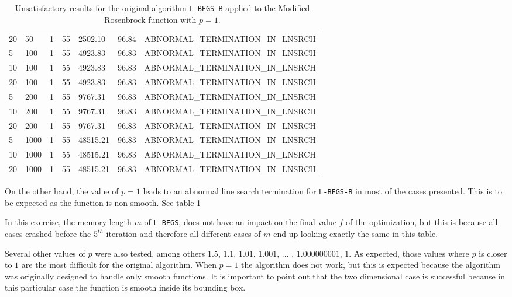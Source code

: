 \begin{center}
\begin{table}
\begin{tabular}{|l|l|l|l|l|p{1.4cm}|p{8.0cm}|}
20 & 50 & 1 & 55 & 2502.10 & 96.84 & ABNORMAL\_TERMINATION\_IN\_LNSRCH \\
5 & 100 & 1 & 55 & 4923.83 & 96.83 & ABNORMAL\_TERMINATION\_IN\_LNSRCH \\
10 & 100 & 1 & 55 & 4923.83 & 96.83 & ABNORMAL\_TERMINATION\_IN\_LNSRCH \\
20 & 100 & 1 & 55 & 4923.83 & 96.83 & ABNORMAL\_TERMINATION\_IN\_LNSRCH \\
5 & 200 & 1 & 55 & 9767.31 & 96.83 & ABNORMAL\_TERMINATION\_IN\_LNSRCH \\
10 & 200 & 1 & 55 & 9767.31 & 96.83 & ABNORMAL\_TERMINATION\_IN\_LNSRCH \\
20 & 200 & 1 & 55 & 9767.31 & 96.83 & ABNORMAL\_TERMINATION\_IN\_LNSRCH \\
5 & 1000 & 1 & 55 & 48515.21 & 96.83 & ABNORMAL\_TERMINATION\_IN\_LNSRCH \\
10 & 1000 & 1 & 55 & 48515.21 & 96.83 & ABNORMAL\_TERMINATION\_IN\_LNSRCH \\
20 & 1000 & 1 & 55 & 48515.21 & 96.83 & ABNORMAL\_TERMINATION\_IN\_LNSRCH \\
  \hline
    \end{tabular}
    \caption[Modified Rosenbrock with $p = 1$]{Unsatisfactory results for the original algorithm \texttt{L-BFGS-B} applied to the Modified Rosenbrock function with $p = 1$.}
  \label{pequal1}
  \end{table}
\end{center}

On the other hand, the value of $p = 1$ leads to an abnormal line search termination for \texttt{L-BFGS-B} in most of the cases presented. This is to be expected as the function is non-smooth. See table \ref{pequal1}

In this exercise, the memory length $m$ of \texttt{L-BFGS}, does not have an impact on the final value $f$ of the optimization, but this is because all cases crashed before the $5^{th}$ iteration and therefore all different cases of $m$ end up looking exactly the same in this table.

Several other values of $p$ were also tested, among others $1.5$, $1.1$, $1.01$, $1.001$, ... , $1.000000001$, $1$. As expected, those values where $p$ is closer to $1$ are the most difficult for the original algorithm. When $p=1$ the algorithm does not work, but this is expected because the algorithm was originally designed to handle only smooth functions. It is important to point out that the two dimensional case is successful because in this particular case the function is smooth inside its bounding box.

